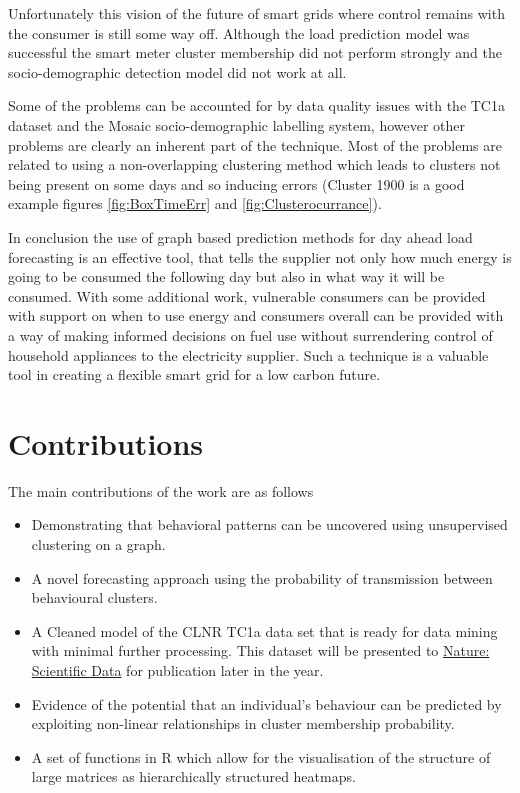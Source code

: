 Unfortunately this vision of the future of smart grids where control remains with the consumer is still some way off. Although the load prediction model was successful the smart meter cluster membership did not perform strongly and the socio-demographic detection model did not work at all. 

Some of the problems can be accounted for by data quality issues with the TC1a dataset and the Mosaic socio-demographic labelling system, however other problems are clearly an inherent part of the technique. Most of the problems are related to using a non-overlapping clustering method which leads to clusters not being present on some days and so inducing errors (Cluster 1900 is a good example figures \ref{fig:BoxTimeErr} and \ref{fig:Clusterocurrance}).

In conclusion the use of graph based prediction methods for day ahead load forecasting is an effective tool, that tells the supplier not only how much energy is going to be consumed the following day but also in what way it will be consumed. With some additional work, vulnerable consumers can be provided with support on when to use energy and consumers overall can be provided with a way of making informed decisions on fuel use without surrendering control of household appliances to the electricity supplier. Such a technique is a valuable tool in creating a flexible smart grid for a low carbon future.

\section{Contributions}
The main contributions of the work are as follows
\begin{itemize}
\itemsep0em 
    \item Demonstrating that behavioral patterns can be uncovered using unsupervised clustering on a graph.
    \item A novel forecasting approach using the probability of transmission between behavioural clusters.
    \item A Cleaned model of the CLNR TC1a data set that is ready for data mining with minimal further processing. This dataset will be presented to \href{http://www.nature.com/sdata/about}{Nature: Scientific Data} for publication later in the year.
    \item Evidence of the potential that an individual's behaviour can be predicted by exploiting non-linear relationships in cluster membership probability.
    \item A set of functions in R which allow for the visualisation of the structure of large matrices as hierarchically structured heatmaps.
\end{itemize}

